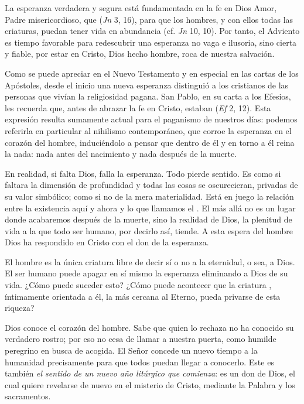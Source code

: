 La esperanza verdadera y segura está fundamentada en la fe en Dios Amor, Padre misericordioso, que  (\emph{Jn} 3, 16), para que los hombres, y con ellos todas las criaturas, puedan tener vida en abundancia (cf. \emph{Jn} 10, 10). Por tanto, el Adviento es tiempo favorable para redescubrir una esperanza no vaga e ilusoria, sino cierta y fiable, por estar  en Cristo, Dios hecho hombre, roca de nuestra salvación.

Como se puede apreciar en el Nuevo Testamento y en especial en las cartas de los Apóstoles, desde el inicio una nueva esperanza distinguió a los cristianos de las personas que vivían la religiosidad pagana. San Pablo, en su carta a los Efesios, les recuerda que, antes de abrazar la fe en Cristo, estaban  (\emph{Ef} 2, 12). Esta expresión resulta sumamente actual para el paganismo de nuestros días: podemos referirla en particular al nihilismo contemporáneo, que corroe la esperanza en el corazón del hombre, induciéndolo a pensar que dentro de él y en torno a él reina la nada: nada antes del nacimiento y nada después de la muerte.

En realidad, si falta Dios, falla la esperanza. Todo pierde sentido. Es como si faltara la dimensión de profundidad y todas las cosas se oscurecieran, privadas de su valor simbólico; como si no  de la mera materialidad. Está en juego la relación entre la existencia aquí y ahora y lo que llamamos el . El más allá no es un lugar donde acabaremos después de la muerte, sino la realidad de Dios, la plenitud de vida a la que todo ser humano, por decirlo así, tiende. A esta espera del hombre Dios ha respondido en Cristo con el don de la esperanza.

El hombre es la única criatura libre de decir sí o no a la eternidad, o sea, a Dios. El ser humano puede apagar en sí mismo la esperanza eliminando a Dios de su vida. ¿Cómo puede suceder esto? ¿Cómo puede acontecer que la criatura , íntimamente orientada a él, la más cercana al Eterno, pueda privarse de esta riqueza?

Dios conoce el corazón del hombre. Sabe que quien lo rechaza no ha conocido su verdadero rostro; por eso no cesa de llamar a nuestra puerta, como humilde peregrino en busca de acogida. El Señor concede un nuevo tiempo a la humanidad precisamente para que todos puedan llegar a conocerlo. Este es también \emph{el sentido de un nuevo año litúrgico que comienza}: es un don de Dios, el cual quiere revelarse de nuevo en el misterio de Cristo, mediante la Palabra y los sacramentos.

